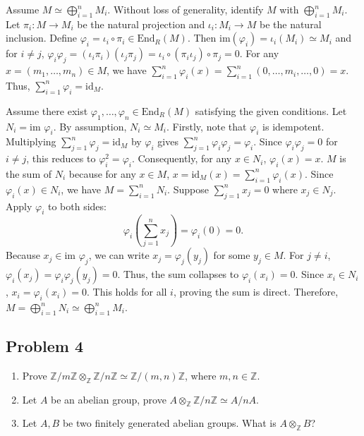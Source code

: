 \begin{solution}
    Assume $M \simeq \bigoplus_{i=1}^n M_i$. Without loss of generality, identify $M$ with $\bigoplus_{i=1}^n M_i$.
    Let $\pi_i: M \to M_i$ be the natural projection and $\iota_i: M_i \to M$ be the natural inclusion. 
    Define $\varphi_i = \iota_i \circ \pi_i \in \text{End}_R(M)$. Then $\text{im} (\varphi_i) = \iota_i(M_i) \simeq M_i$
    and for $i \neq j$, $\varphi_i \varphi_j = (\iota_i \pi_i)(\iota_j \pi_j) = \iota_i \circ (\pi_i \iota_j) \circ \pi_j = 0$.
    For any $x = (m_1, \dots, m_n) \in M$, we have $\sum_{i=1}^n \varphi_i(x) = \sum_{i=1}^n (0, \dots, m_i, \dots, 0) = x$. Thus, $\sum_{i=1}^n \varphi_i = \text{id}_M$.
    
    Assume there exist $\varphi_1, \dots, \varphi_n \in \text{End}_R(M)$ satisfying the given conditions. Let $N_i = \text{im } \varphi_i$. By assumption, $N_i \simeq M_i$.
    Firstly, note that $\varphi_i$ is idempotent. Multiplying $\sum_{j=1}^n \varphi_j = \text{id}_M$ by $\varphi_i$ gives $\sum_{j=1}^n \varphi_i \varphi_j = \varphi_i$. Since $\varphi_i \varphi_j = 0$ for $i \neq j$, this reduces to $\varphi_i^2 = \varphi_i$. 
    Consequently, for any $x \in N_i$, $\varphi_i(x) = x$. $M$ is the sum of $N_i$ because for any $x \in M$, $x = \text{id}_M(x) = \sum_{i=1}^n \varphi_i(x)$. Since $\varphi_i(x) \in N_i$, we have $M = \sum_{i=1}^n N_i$.
    Suppose $\sum_{j=1}^n x_j = 0$ where $x_j \in N_j$. Apply $\varphi_i$ to both sides:
    $$\varphi_i \left( \sum_{j=1}^n x_j \right) = \varphi_i(0) = 0.$$
    Because $x_j \in \text{im } \varphi_j$, we can write $x_j = \varphi_j(y_j)$ for some $y_j \in M$. 
    For $j \neq i$, $\varphi_i(x_j) = \varphi_i \varphi_j(y_j) = 0$. 
    Thus, the sum collapses to $\varphi_i(x_i) = 0$. Since $x_i \in N_i$, $x_i = \varphi_i(x_i) = 0$. 
    This holds for all $i$, proving the sum is direct. Therefore, $M = \bigoplus_{i=1}^n N_i \simeq \bigoplus_{i=1}^n M_i$. 
\end{solution}

\subsection*{Problem 4}
\begin{enumerate}
    \item Prove $\mathbb{Z}/m\mathbb{Z} \otimes_{\mathbb{Z}} \mathbb{Z}/n\mathbb{Z} \simeq \mathbb{Z}/(m,n)\mathbb{Z}$, where $m, n \in \mathbb{Z}$.
    \item Let $A$ be an abelian group, prove $A \otimes_{\mathbb{Z}} \mathbb{Z}/n\mathbb{Z} \simeq A/nA$.
    \item Let $A, B$ be two finitely generated abelian groups. What is $A \otimes_{\mathbb{Z}} B$?
\end{enumerate}

